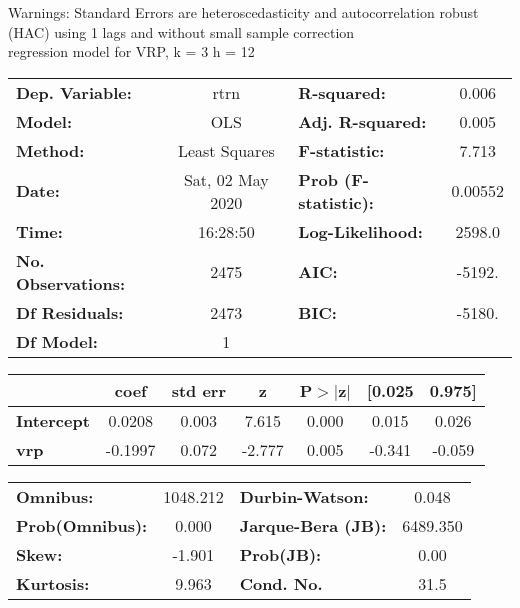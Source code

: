 Warnings: \newline
 [1] Standard Errors are heteroscedasticity and autocorrelation robust (HAC) using 1 lags and without small sample correction\\ 

regression model for VRP, k = 3 h = 12\begin{center}
\begin{tabular}{lclc}
\toprule
\textbf{Dep. Variable:}    &       rtrn       & \textbf{  R-squared:         } &     0.006   \\
\textbf{Model:}            &       OLS        & \textbf{  Adj. R-squared:    } &     0.005   \\
\textbf{Method:}           &  Least Squares   & \textbf{  F-statistic:       } &     7.713   \\
\textbf{Date:}             & Sat, 02 May 2020 & \textbf{  Prob (F-statistic):} &  0.00552    \\
\textbf{Time:}             &     16:28:50     & \textbf{  Log-Likelihood:    } &    2598.0   \\
\textbf{No. Observations:} &        2475      & \textbf{  AIC:               } &    -5192.   \\
\textbf{Df Residuals:}     &        2473      & \textbf{  BIC:               } &    -5180.   \\
\textbf{Df Model:}         &           1      & \textbf{                     } &             \\
\bottomrule
\end{tabular}
\begin{tabular}{lcccccc}
                   & \textbf{coef} & \textbf{std err} & \textbf{z} & \textbf{P$> |$z$|$} & \textbf{[0.025} & \textbf{0.975]}  \\
\midrule
\textbf{Intercept} &       0.0208  &        0.003     &     7.615  &         0.000        &        0.015    &        0.026     \\
\textbf{vrp}       &      -0.1997  &        0.072     &    -2.777  &         0.005        &       -0.341    &       -0.059     \\
\bottomrule
\end{tabular}
\begin{tabular}{lclc}
\textbf{Omnibus:}       & 1048.212 & \textbf{  Durbin-Watson:     } &    0.048  \\
\textbf{Prob(Omnibus):} &   0.000  & \textbf{  Jarque-Bera (JB):  } & 6489.350  \\
\textbf{Skew:}          &  -1.901  & \textbf{  Prob(JB):          } &     0.00  \\
\textbf{Kurtosis:}      &   9.963  & \textbf{  Cond. No.          } &     31.5  \\
\bottomrule
\end{tabular}
\end{center}

